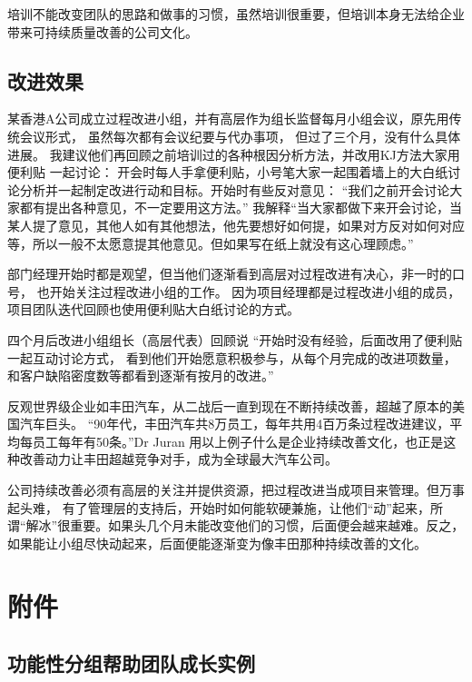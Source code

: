 培训不能改变团队的思路和做事的习惯，虽然培训很重要，但培训本身无法给企业带来可持续质量改善的公司文化。

\hypertarget{ux6539ux8fdbux6548ux679c}{%
\subsection{改进效果}\label{ux6539ux8fdbux6548ux679c}}

某香港A公司成立过程改进小组，并有高层作为组长监督每月小组会议，原先用传统会议形式，
虽然每次都有会议纪要与代办事项， 但过了三个月，没有什么具体进展。
我建议他们再回顾之前培训过的各种根因分析方法，并改用KJ方法大家用便利贴
一起讨论：
开会时每人手拿便利贴，小号笔大家一起围着墙上的大白纸讨论分析并一起制定改进行动和目标。开始时有些反对意见：
``我们之前开会讨论大家都有提出各种意见，不一定要用这方法。''
我解释``当大家都做下来开会讨论，当某人提了意见，其他人如有其他想法，他先要想好如何提，如果对方反对如何对应等，所以一般不太愿意提其他意见。但如果写在纸上就没有这心理顾虑。''

部门经理开始时都是观望，但当他们逐渐看到高层对过程改进有决心，非一时的口号，
也开始关注过程改进小组的工作。 因为项目经理都是过程改进小组的成员，
项目团队迭代回顾也使用便利贴大白纸讨论的方式。

四个月后改进小组组长（高层代表）回顾说
``开始时没有经验，后面改用了便利贴一起互动讨论方式，
看到他们开始愿意积极参与，从每个月完成的改进项数量，
和客户缺陷密度数等都看到逐渐有按月的改进。''

反观世界级企业如丰田汽车，从二战后一直到现在不断持续改善，超越了原本的美国汽车巨头。
``90年代，丰田汽车共8万员工，每年共用4百万条过程改进建议，平均每员工每年有50条。''Dr
Juran
用以上例子什么是企业持续改善文化，也正是这种改善动力让丰田超越竞争对手，成为全球最大汽车公司。

公司持续改善必须有高层的关注并提供资源，把过程改进当成项目来管理。但万事起头难，
有了管理层的支持后，开始时如何能软硬兼施，让他们``动''起来，所谓``解冰''很重要。如果头几个月未能改变他们的习惯，后面便会越来越难。反之，如果能让小组尽快动起来，后面便能逐渐变为像丰田那种持续改善的文化。

\hypertarget{ux9644ux4ef6}{%
\section{附件}\label{ux9644ux4ef6}}

\hypertarget{ux529fux80fdux6027ux5206ux7ec4ux5e2eux52a9ux56e2ux961fux6210ux957fux5b9eux4f8b}{%
\subsection{功能性分组帮助团队成长实例}\label{ux529fux80fdux6027ux5206ux7ec4ux5e2eux52a9ux56e2ux961fux6210ux957fux5b9eux4f8b}}

